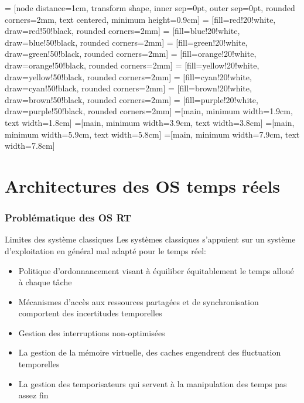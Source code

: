 %                                                                                                               
%
%


     = [node distance=1cm, transform shape, inner sep=0pt, outer sep=0pt, rounded corners=2mm, text centered, minimum height=0.9cm]
     = [fill=red!20!white,     draw=red!50!black,     rounded corners=2mm]
    = [fill=blue!20!white,    draw=blue!50!black,    rounded corners=2mm]
   = [fill=green!20!white,   draw=green!50!black,   rounded corners=2mm]
  = [fill=orange!20!white,  draw=orange!50!black,  rounded corners=2mm]
  = [fill=yellow!20!white,  draw=yellow!50!black,  rounded corners=2mm]
    = [fill=cyan!20!white,    draw=cyan!50!black,    rounded corners=2mm]
   = [fill=brown!20!white,   draw=brown!50!black,   rounded corners=2mm]
  = [fill=purple!20!white,  draw=purple!50!black,  rounded corners=2mm]
=[main, minimum width=1.9cm, text width=1.8cm]
=[main, minimum width=3.9cm, text width=3.8cm]
=[main, minimum width=5.9cm, text width=5.8cm]
=[main, minimum width=7.9cm, text width=7.8cm]

\part{Architectures des OS temps réels}

\section{Problématique des OS RT} %

\begin{frame}{Limites des système classiques}
  Les systèmes classiques s'appuient sur un système d'exploitation en général mal adapté pour le temps réel:
  \begin{itemize}
  \item Politique d'ordonnancement visant à équiliber équitablement le temps alloué à chaque tâche
  \item Mécanismes d'accès aux ressources partagées et de synchronisation comportent des incertitudes temporelles
  \item Gestion des interruptions non-optimisées
  \item La gestion de la mémoire virtuelle, des caches engendrent des fluctuation temporelles
  \item La gestion des temporisateurs qui servent à la manipulation des temps pas assez fin
  \end{itemize} 
\end{frame}

